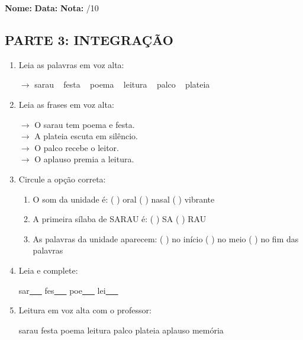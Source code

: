 \begin{exercicio}

\noindent\textbf{Nome:} \underline{\hspace{3.2cm}} \quad \textbf{Data:} \underline{\hspace{1.6cm}} \quad \textbf{Nota:} \underline{\hspace{0.9cm}}/10


\subsection*{PARTE 3: INTEGRAÇÃO}

\begin{enumerate}[resume]

  \item Leia as palavras em voz alta:
  \begin{center}
  $\rightarrow$ sarau ~ festa ~ poema ~ leitura ~ palco ~ plateia
  \end{center}

  \item Leia as frases em voz alta:
  \begin{center}
  $\rightarrow$ O sarau tem poema e festa.\\
  $\rightarrow$ A plateia escuta em silêncio.\\
  $\rightarrow$ O palco recebe o leitor.\\
  $\rightarrow$ O aplauso premia a leitura.\\
  \end{center}

  \item Circule a opção correta:
  \begin{enumerate}[label=(\alph*)]

    \item O som da unidade é: ( ) oral ( ) nasal ( ) vibrante

    \item A primeira sílaba de SARAU é: ( ) SA ( ) RAU

    \item As palavras da unidade aparecem: ( ) no início ( ) no meio ( ) no fim das palavras

  \end{enumerate}

  \item Leia e complete:
  \begin{center}
  sar\underline{~~~} \quad fes\underline{~~~} \quad poe\underline{~~~} \quad lei\underline{~~~}
  \end{center}

  \item Leitura em voz alta com o professor:
  \begin{center}
  sarau \quad festa \quad poema \quad leitura \quad palco \quad plateia \quad aplauso \quad memória
  \end{center}

\end{enumerate}

\end{exercicio}

